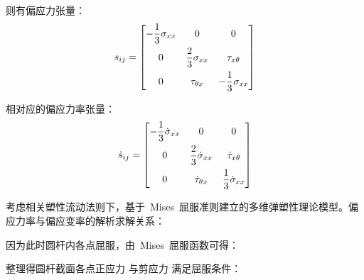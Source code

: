 则有偏应力张量：
\begin{equation}\label{eq14}
    s_{ij} = \begin{bmatrix}
        -\dfrac{1}{3}\sigma_{xx} & 0 & 0 \vspace{1ex}\\
        0 & \dfrac{2}{3}\sigma_{xx} & \tau_{x \theta}\vspace{1ex}\\
        0 & \tau_{\theta x} & -\dfrac{1}{3}\sigma_{xx}
        \end{bmatrix}
\end{equation} 

相对应的偏应力率张量：
\begin{equation}\label{eq15}
    \dot s_{ij} = \begin{bmatrix}
        -\dfrac{1}{3}\dot \sigma_{xx} & 0 & 0 \vspace{1ex}\\
        0 & \dfrac{2}{3}\dot \sigma_{xx} & \dot \tau_{x \theta}\vspace{1ex}\\
        0 & \dot \tau_{\theta x} & \dfrac{1}{3}\dot \sigma_{xx}
        \end{bmatrix}
\end{equation} 

考虑相关塑性流动法则下，基于~Mises~屈服准则建立的多维弹塑性理论模型。偏应力率与偏应变率的解析求解关系：

因为此时圆杆内各点屈服，由~Mises~屈服函数可得：

整理得圆杆截面各点正应力 与剪应力 满足屈服条件：




